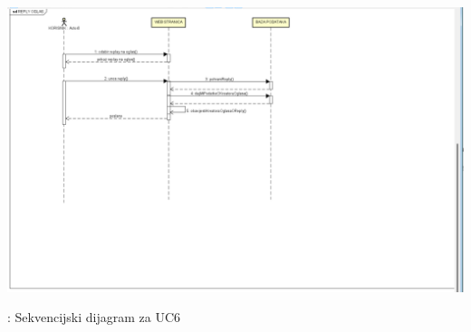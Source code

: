 			    \\
                \begin{fig}
				    \graphicspath{ {slike/} }
  
                    \centering
                    \includegraphics[width=\textwidth]{REPLY OGLAS.png}
                    \caption{: Sekvencijski dijagram za UC6}
                \end{fig}
				\\

